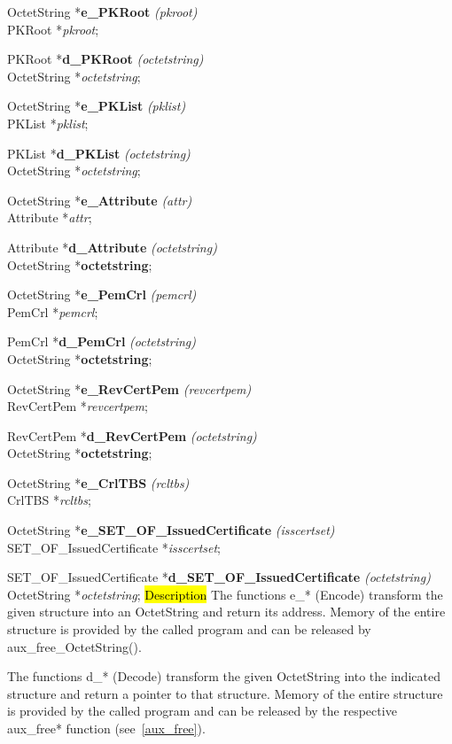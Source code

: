 OctetString *{\bf e\_PKRoot} {\em (pkroot)} \\
PKRoot *{\em pkroot};

PKRoot *{\bf d\_PKRoot} {\em (octetstring)} \\
OctetString *{\em octetstring};

OctetString *{\bf e\_PKList} {\em (pklist)} \\
PKList *{\em pklist};

PKList *{\bf d\_PKList} {\em (octetstring)} \\
OctetString *{\em octetstring};

OctetString *{\bf e\_Attribute} {\em (attr)} \\
Attribute *{\em attr};

Attribute *{\bf d\_Attribute} {\em (octetstring)} \\
OctetString *{\bf octetstring};

OctetString *{\bf e\_PemCrl} {\em (pemcrl)} \\
PemCrl *{\em pemcrl};

PemCrl *{\bf d\_PemCrl} {\em (octetstring)} \\
OctetString *{\bf octetstring};

OctetString *{\bf e\_RevCertPem} {\em (revcertpem)} \\
RevCertPem *{\em revcertpem};

RevCertPem *{\bf d\_RevCertPem} {\em (octetstring)} \\
OctetString *{\bf octetstring};

OctetString *{\bf e\_CrlTBS} {\em (rcltbs)} \\
CrlTBS *{\em rcltbs};

OctetString *{\bf e\_SET\_OF\_IssuedCertificate} {\em (isscertset)} \\
SET\_OF\_IssuedCertificate  *{\em isscertset};

SET\_OF\_IssuedCertificate  *{\bf d\_SET\_OF\_IssuedCertificate} {\em (octetstring)}
OctetString *{\em octetstring};
\hl{Description}     
The functions e\_* (Encode) transform the given structure into an OctetString
and return its address. Memory of the entire structure is provided 
by the called program and can be released
by aux\_free\_OctetString().

The functions d\_* (Decode) transform the given OctetString into the indicated structure and return
a pointer to that structure. Memory of the entire structure is provided 
by the called program and can be released by the respective aux\_free* function (see~\ref{aux_free}).

